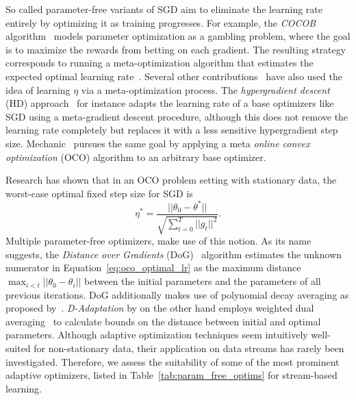 \documentclass[runningheads]{llncs}
\begin{document}
So called parameter-free variants of SGD aim to eliminate the learning rate entirely by optimizing it as training progresses.
For example, the \textit{COCOB} algorithm~\cite{orabonaTrainingDeepNetworks2017} models parameter optimization as a gambling problem, where the goal is to maximize the rewards from betting on each gradient.
The resulting strategy corresponds to running a meta-optimization algorithm that estimates the expected optimal learning rate~\cite{orabonaTrainingDeepNetworks2017}.
Several other contributions~\cite{vanervenMetaGradMultipleLearning2016a,baydinOnlineLearningRate2018,cutkoskyMechanicLearningRate2023} have also used the idea of learning $\eta$ via a meta-optimization process.
The \textit{hypergradient descent} (HD) approach~\cite{baydinOnlineLearningRate2018} for instance adapts the learning rate of a base optimizers like SGD using a meta-gradient descent procedure, although this does not remove the learning rate completely but replaces it with a less sensitive hypergradient step size.
Mechanic~\cite{cutkoskyMechanicLearningRate2023} pursues the same goal by applying a meta \textit{online convex optimization} (OCO) algorithm to an arbitrary base optimizer.

Research has shown that in an OCO problem setting with stationary data, the worst-case optimal fixed step size for SGD is
\begin{equation}\label{eq:oco_optimal_lr}
	\eta^* = \frac{||\theta_0 - \theta^*||}{\sqrt{\sum_{t=0}^{T} ||g_t||^2}}.
\end{equation}
Multiple parameter-free optimizers, make use of this notion.
As its name suggests, the \textit{Distance over Gradients} (DoG)~\cite{ivgiDoGSGDBest2023} algorithm estimates the unknown numerator in Equation~\ref{eq:oco_optimal_lr} as the maximum distance $\max_{i<t}||\theta_0 - \theta_i||$ between the initial parameters and the parameters of all previous iterations.
DoG additionally makes use of polynomial decay averaging as proposed by~\textcite{shamirStochasticGradientDescent2012}.
\textit{D-Adaptation} by \textcite{defazioLearningRateFreeLearningDAdaptation2023a} on the other hand employs weighted dual averaging~\cite{duchiDualAveragingDistributed2012} to calculate bounds on the distance between initial and optimal parameters.
Although adaptive optimization techniques seem intuitively well-suited for non-stationary data, their application on data streams has rarely been investigated.
Therefore, we assess the suitability of some of the most prominent adaptive optimizers, listed in Table~\ref{tab:param_free_optims} for stream-based learning.
\end{document}
